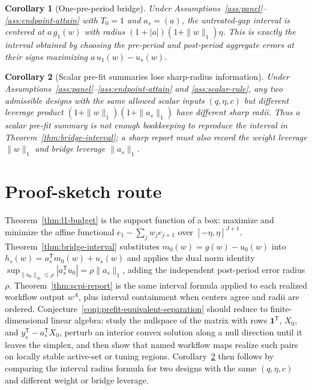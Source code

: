 \documentclass[11pt]{article}
\newcommand{\one}{\mathbf{1}}
\newcommand{\transpose}{\mathsf{T}}
\theoremstyle{definition}
\theoremstyle{plain}
\newtheorem{corollary}{Corollary}
\theoremstyle{remark}
\begin{document}
\begin{corollary}[One-pre-period bridge]\label{cor:one-pre}
Under Assumptions~\ref{ass:panel}--\ref{ass:endpoint-attain} with \(T_0=1\) and \(a_s=(a)\), the untreated-gap interval is centered at \(a\,g_1(w)\) with radius \((1+|a|)(1+\|w\|_1)\eta\). This is exactly the interval obtained by choosing the pre-period and post-period aggregate errors at their signs maximizing \(a\,u_1(w)-u_s(w)\).
\end{corollary}

\begin{corollary}[Scalar pre-fit summaries lose sharp-radius information]\label{cor:scalar-bookkeeping}
Under Assumptions~\ref{ass:panel}--\ref{ass:endpoint-attain} and \ref{ass:scalar-rule}, any two admissible designs with the same allowed scalar inputs \((q,\eta,c)\) but different leverage product \((1+\|w\|_1)(1+\|a_s\|_1)\) have different sharp radii. Thus a scalar pre-fit summary is not enough bookkeeping to reproduce the interval in Theorem~\ref{thm:bridge-interval}; a sharp report must also record the weight leverage \(\|w\|_1\) and bridge leverage \(\|a_s\|_1\).
\end{corollary}

\section{Proof-sketch route}
Theorem~\ref{thm:l1-budget} is the support function of a box: maximize and minimize the affine functional \(e_1-\sum_jw_je_{j+1}\) over \([-\eta,\eta]^{J+1}\). Theorem~\ref{thm:bridge-interval} substitutes \(m_0(w)=g(w)-u_0(w)\) into \(h_s(w)=a_s^\transpose m_0(w)+u_s(w)\) and applies the dual norm identity \(\sup_{\|u_0\|_\infty\le\rho} |a_s^\transpose u_0|=\rho\|a_s\|_1\), adding the independent post-period error radius \(\rho\). Theorem~\ref{thm:scpi-report} is the same interval formula applied to each realized workflow output \(w^A\), plus interval containment when centers agree and radii are ordered. Conjecture~\ref{conj:prefit-equivalent-separation} should reduce to finite-dimensional linear algebra: study the nullspace of the matrix with rows \(\one^\transpose\), \(X_0\), and \(y_s^\transpose-a_s^\transpose X_0\), perturb an interior convex solution along a null direction until it leaves the simplex, and then show that named workflow maps realize such pairs on locally stable active-set or tuning regions. Corollary~\ref{cor:scalar-bookkeeping} then follows by comparing the interval radius formula for two designs with the same \((q,\eta,c)\) and different weight or bridge leverage.
\end{document}
